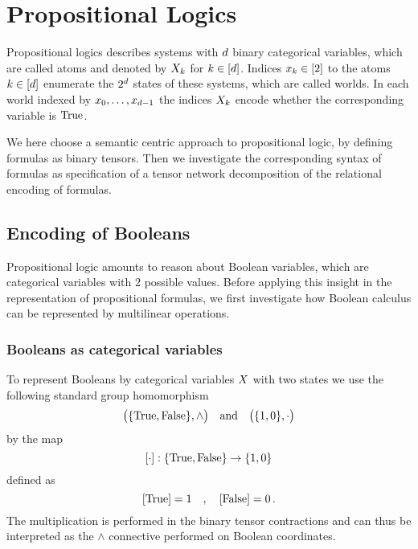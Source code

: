 \section{Propositional Logics}\label{cha:FormulaTensors}

Propositional logics describes systems with $d$ binary categorical variables, which are called atoms and denoted by $X_{k}$ for $k\in[d]$.
Indices $x_{k}\in[2]$ to the atoms $k\in[d]$ enumerate the $2^d$ states of these systems, which are called worlds.
In each world indexed by ${x_{0},\ldots,x_{d-1}}$ the indices $X_{k}$ encode whether the corresponding variable is $\mathrm{True}$. 

We here choose a semantic centric approach to propositional logic, by defining formulas as binary tensors.
Then we investigate the corresponding syntax of formulas as specification of a tensor network decomposition of the relational encoding of formulas.


\subsection{Encoding of Booleans}

Propositional logic amounts to reason about Boolean variables, which are categorical variables with $2$ possible values.
Before applying this insight in the representation of propositional formulas, we first investigate how Boolean calculus can be represented by multilinear operations.

\subsubsection{Booleans as categorical variables}


	To represent Booleans by categorical variables $X$ with two states we use the following standard group homomorphism %
		\[ \big(\{\mathrm{True},\mathrm{False}\},\land\big) \quad \text{and} \quad \big(\{ 1,0\},\cdot\big) \]
	by the map
    		\[ [\cdot]:\{\mathrm{True},\mathrm{False}\} \rightarrow \{1,0\} \]
	defined as
	    	\[ [\mathrm{True}] = 1 \quad , \quad [\mathrm{False}] = 0 \, . \]
	The multiplication is performed in the binary tensor contractions and can thus be interpreted as the $\land$ connective performed on Boolean coordinates.


